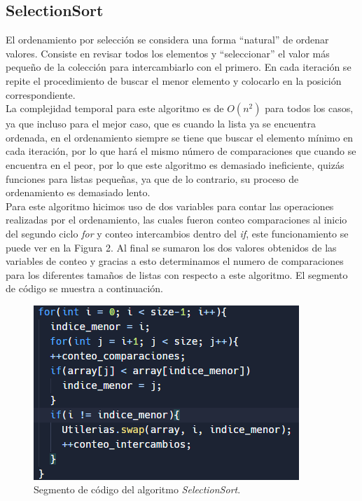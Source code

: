 \documentclass[a4paper,12pt]{article}
\begin{document}
\subsection{SelectionSort}

El ordenamiento por selección se considera una forma “natural” de ordenar valores. Consiste en revisar todos los elementos y “seleccionar” el valor más pequeño de la colección para intercambiarlo con el primero. En cada iteración se repite el procedimiento de buscar el menor elemento y colocarlo en la posición correspondiente.\\

La complejidad temporal para este algoritmo es de $O(n^2)$ para todos los casos, ya que incluso para el mejor caso, que es cuando la lista ya se encuentra ordenada, en el ordenamiento siempre se tiene que buscar el elemento mínimo en cada iteración, por lo que hará el mismo número de comparaciones que cuando se encuentra en el peor, por lo que este algoritmo es demasiado ineficiente, quizás funciones para listas pequeñas, ya que de lo contrario, su proceso de ordenamiento es demasiado lento.\\

Para este algoritmo hicimos uso de dos variables para contar las operaciones realizadas por el ordenamiento, las cuales fueron conteo comparaciones al inicio del segundo ciclo \textit{for} y conteo intercambios dentro del \textit{if}, este funcionamiento se puede ver en la Figura 2. Al final se sumaron los dos valores obtenidos de las variables de conteo y gracias a esto determinamos el numero de comparaciones para los diferentes tamaños de listas con respecto a este algoritmo. El segmento de código se muestra a continuación.\\

\begin{figure}[h]
    \centering
    \includegraphics[width=0.8\linewidth]{media/selectionSort.png}
    \caption{Segmento de código del algoritmo \textit{SelectionSort}.}
    \label{fig:selection}
\end{figure}
\end{document}
